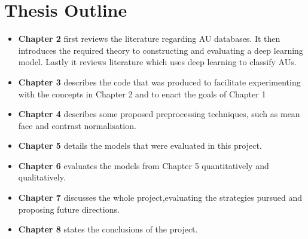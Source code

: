   \section{Thesis Outline}
    \begin{itemize}
      \item {\bf Chapter 2} first reviews the literature regarding AU databases. It then introduces the
            required theory to constructing and evaluating a deep learning model. Lastly it
            reviews literature which uses deep learning to classify AUs.
      \item {\bf Chapter 3} describes the code that was produced to facilitate experimenting with
            the concepts in Chapter 2 and to enact the goals of Chapter 1
      \item {\bf Chapter 4} describes some proposed preprocessing techniques, such as mean face
            and contrast normalisation.
      \item {\bf Chapter 5} details the models that were evaluated in this project.
      \item {\bf Chapter 6} evaluates the models from Chapter 5 quantitatively and qualitatively.
      \item {\bf Chapter 7} discusses the whole project,evaluating the strategies pursued and
            proposing future directions.
      \item {\bf Chapter 8} states the conclusions of the project.
  \end{itemize}
